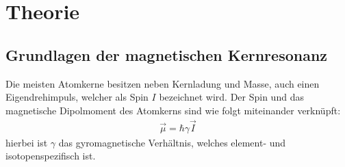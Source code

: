 \section{Theorie}
\label{sec:Theorie}
\subsection{Grundlagen der magnetischen Kernresonanz}
Die meisten Atomkerne besitzen neben Kernladung und Masse, auch einen Eigendrehimpuls, welcher als Spin $I$ bezeichnet wird.
Der Spin und das magnetische Dipolmoment des Atomkerns sind wie folgt miteinander verkn\"{u}pft:
\begin{align*}
	\overrightarrow{\mu} = \hbar \gamma \overrightarrow{I}
\end{align*}
hierbei ist $\gamma$ das gyromagnetische Verh\"{a}ltnis, welches element- und isotopenspezifisch ist.

